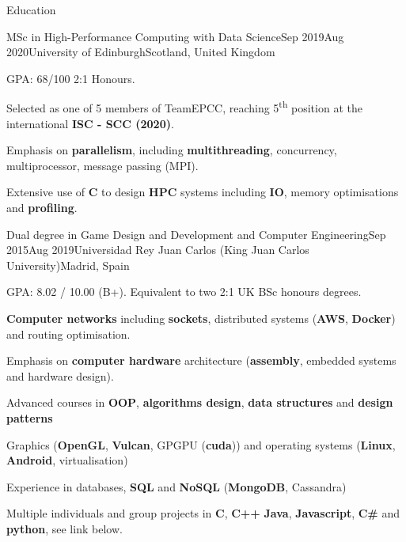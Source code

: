 \documentclass{resume} %
\begin{document}
\begin{mainSection}{Education}
\begin{educationItem}
{MSc in High-Performance Computing with Data Science}{Sep 2019}{Aug 2020}{University of Edinburgh}{Scotland, United Kingdom}

\item GPA: 68/100 2:1 Honours.

\item Selected as one of 5 members of TeamEPCC, reaching 5\textsuperscript{th} position at the international \textbf{ISC - SCC (2020)}.%

\item Emphasis on \textbf{parallelism}, including \textbf{multithreading}, concurrency, multiprocessor, message passing (MPI).

\item Extensive use of \textbf{C} to design \textbf{HPC} systems including \textbf{IO}, memory optimisations and \textbf{profiling}.
\end{educationItem}
\begin{educationItem}
{Dual degree in Game Design and Development and Computer Engineering}{Sep 2015}{Aug 2019}{Universidad Rey Juan Carlos (King Juan Carlos University)}{Madrid, Spain}

\item GPA: 8.02 / 10.00 (B+). Equivalent to two 2:1 UK BSc honours degrees.

\item \textbf{Computer networks} including \textbf{sockets}, distributed systems (\textbf{AWS}, \textbf{Docker}) and routing optimisation.

\item Emphasis on \textbf{computer hardware} architecture (\textbf{assembly}, embedded systems and hardware design).

\item Advanced courses in \textbf{OOP}, \textbf{algorithms design}, \textbf{data structures} and \textbf{design patterns}

\item Graphics (\textbf{OpenGL}, \textbf{Vulcan}, GPGPU (\textbf{cuda})) and operating systems (\textbf{Linux}, \textbf{Android}, virtualisation)

\item Experience in databases, \textbf{SQL} and \textbf{NoSQL} (\textbf{MongoDB}, Cassandra)

\item Multiple individuals and group projects in \textbf{C}, \textbf{C++} \textbf{Java}, \textbf{Javascript}, \textbf{C\#} and \textbf{python}, see link below.
\end{educationItem}
\end{mainSection}
\end{document}
